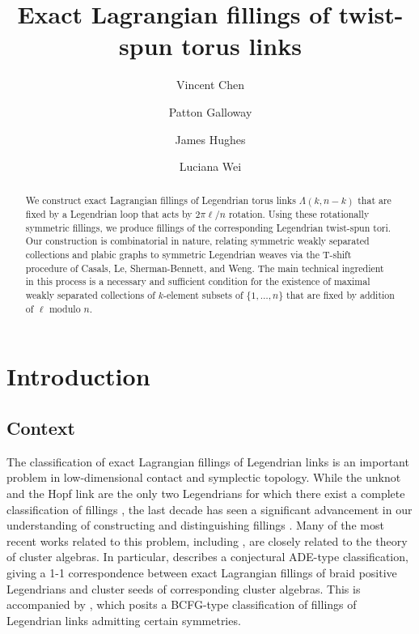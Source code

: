 \documentclass[11pt]{amsart}
\title{Exact Lagrangian fillings of twist-spun torus links}
\author{Vincent Chen}
\author{Patton Galloway}
\author{James Hughes}
\author{Luciana Wei}
\newcommand{\La}{\Lambda}
\theoremstyle{plain}
\theoremstyle{definition}
\begin{document}
\begin{abstract} 

We construct exact Lagrangian fillings of Legendrian torus links $\La(k, n-k)$ that are fixed by a Legendrian loop that acts by $2\pi\ell/n$ rotation. Using these rotationally symmetric fillings, we produce fillings of the corresponding Legendrian twist-spun tori. Our construction is combinatorial in nature, relating symmetric weakly separated collections and plabic graphs to symmetric Legendrian weaves via the T-shift procedure of Casals, Le, Sherman-Bennett, and Weng. The main technical ingredient in this process is a necessary and sufficient condition for the existence of maximal weakly separated collections of $k$-element subsets of $\{1, \dots, n\}$ that are fixed by addition of $\ell$ modulo $n$.

\end{abstract}
\maketitle


\section{Introduction}


\subsection{Context}
The classification of exact Lagrangian fillings of Legendrian links is an important problem in low-dimensional contact and symplectic topology. While the unknot and the Hopf link are the only two Legendrians for which there exist a complete classification of fillings \cite{EliashbergPolterovich96, Thomson25}, the last decade has seen a significant advancement in our understanding of constructing and distinguishing fillings \cite{EHK, YuPan, TreumannZaslow, CasalsNg, capovillasearle2023newton}. Many of the most recent works related to this problem, including \cite{STWZ, CasalsGao, GSW, ABL22, Hughes2021, CasalsWeng}, are closely related to the theory of cluster algebras. In particular, \cite[Conjecture 5.1]{CasalsLagSkel} describes a conjectural ADE-type classification, giving a 1-1 correspondence between exact Lagrangian fillings of braid positive Legendrians and cluster seeds of corresponding cluster algebras. This is accompanied by \cite[Conjecture 5.4]{CasalsLagSkel}, which posits a BCFG-type classification of fillings of Legendrian links admitting certain symmetries. 
\end{document}
